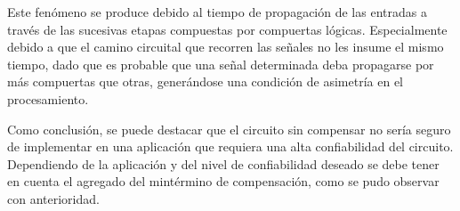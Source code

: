 Este fen\'omeno se produce debido al tiempo de propagaci\'on de las entradas a trav\'es de las sucesivas etapas compuestas por compuertas l\'ogicas. Especialmente debido a que el camino circuital que recorren las se\~nales no les insume el mismo tiempo,  dado que es probable que una se\~nal determinada deba propagarse por m\'as compuertas que otras, gener\'andose una condici\'on de asimetr\'ia en el procesamiento. 

Como conclusi\'on, se puede destacar que el circuito sin compensar no ser\'ia seguro de implementar en una aplicaci\'on que requiera una alta confiabilidad del circuito. Dependiendo de la aplicaci\'on y del nivel de confiabilidad deseado se debe tener en cuenta el agregado del mint\'ermino de compensaci\'on, como se pudo observar con anterioridad.





